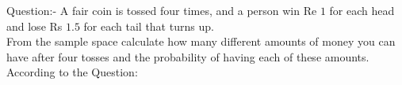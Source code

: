 \documentclass[journal,12pt,twocolumn]{IEEEtran}
\theoremstyle{remark}
\begin{document}



\maketitle

\newpage


\bigskip

\renewcommand{\thefigure}{\theenumi}
\renewcommand{\thetable}{\theenumi}

%




%
Question:-
A fair coin is tossed four times, and a person win Re $1$ for each head and lose Rs $1.5$ for each tail that turns up.\\
From the sample space calculate how many different amounts of money you can have after four tosses and the probability of having each of these amounts.
\\
\solution
\fi
According to the Question:\\
\end{document}
